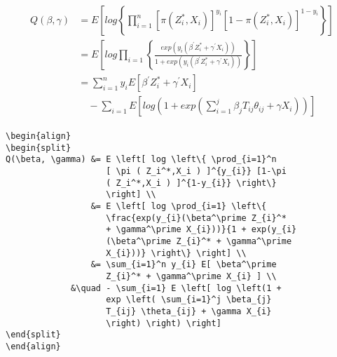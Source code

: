 \documentclass[12pt, a4paper]{article}
\begin{document}
\begin{align}
   \begin{split}
      Q(\beta, \gamma) &= E \left[ log \left\{ \prod_{i=1}^n [ \pi ( Z_i^*,X_i ) ]^{y_{i}} [1-\pi ( Z_i^*,X_i ) ]^{1-y_{i}} \right\} \right] \\
                       &= E \left[ log \prod_{i=1} \left\{ \frac{exp(y_{i}(\beta^\prime Z_{i}^* + \gamma^\prime X_{i}))}{1 + exp(y_{i}(\beta^\prime Z_{i}^* + \gamma^\prime X_{i}))} \right\} \right] \\
                       &= \sum_{i=1}^n y_{i} E[ \beta^\prime Z_{i}^* + \gamma^\prime X_{i} ] \\
                       &\quad - \sum_{i=1} E \left[ log \left( 1 + exp \left( \sum_{i=1}^j \beta_{j} T_{ij} \theta_{ij} + \gamma X_{i} \right) \right) \right]
   \end{split}
\end{align}
\begin{lstlisting}
\begin{align}
\begin{split}
Q(\beta, \gamma) &= E \left[ log \left\{ \prod_{i=1}^n
                    [ \pi ( Z_i^*,X_i ) ]^{y_{i}} [1-\pi
                    ( Z_i^*,X_i ) ]^{1-y_{i}} \right\}
                    \right] \\
                 &= E \left[ log \prod_{i=1} \left\{
                    \frac{exp(y_{i}(\beta^\prime Z_{i}^*
                    + \gamma^\prime X_{i}))}{1 + exp(y_{i}
                    (\beta^\prime Z_{i}^* + \gamma^\prime 
                    X_{i}))} \right\} \right] \\
                 &= \sum_{i=1}^n y_{i} E[ \beta^\prime
                    Z_{i}^* + \gamma^\prime X_{i} ] \\
             &\quad - \sum_{i=1} E \left[ log \left(1 +
                    exp \left( \sum_{i=1}^j \beta_{j}
                    T_{ij} \theta_{ij} + \gamma X_{i} 
                    \right) \right) \right]
\end{split}
\end{align}
\end{lstlisting}
\end{document}
